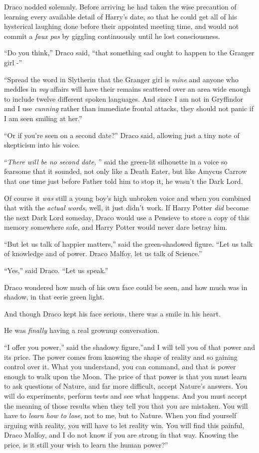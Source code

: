 Draco nodded solemnly. Before arriving he had taken the wise precaution
of learning every available detail of Harry's date, so that he could get
all of his hysterical laughing done before their appointed meeting time,
and would not commit a \emph{faux pas} by giggling continuously until he
lost consciousness.

``Do you think,'' Draco said, ``that something sad ought to happen to
the Granger girl -''

``Spread the word in Slytherin that the Granger girl is \emph{mine} and
anyone who meddles in \emph{my} affairs will have their remains
scattered over an area wide enough to include twelve different spoken
languages. And since I am not in Gryffindor and I use \emph{cunning}
rather than immediate frontal attacks, they should not panic if I am
seen smiling at her.''

``Or if you're seen on a second date?'' Draco said, allowing just a tiny
note of skepticism into his voice.

``\emph{There will be no second date,} '' said the green-lit silhouette in
a voice so fearsome that it sounded, not only like a Death Eater, but
like Amycus Carrow that one time just before Father told him to stop it,
he wasn't the Dark Lord.

Of course it \emph{was} still a young boy's high unbroken voice and when
you combined that with the \emph{actual words}, well, it just didn't
work. If Harry Potter \emph{did} become the next Dark Lord someday,
Draco would use a Pensieve to store a copy of this memory somewhere
safe, and Harry Potter would never dare betray him.

``But let us talk of happier matters,'' said the green-shadowed figure.
``Let us talk of knowledge and of power. Draco Malfoy, let us talk of
Science.''

``Yes,'' said Draco. ``Let us speak.''

Draco wondered how much of his own face could be seen, and how much was
in shadow, in that eerie green light.

And though Draco kept his face serious, there was a smile in his heart.

He was \emph{finally} having a real grownup conversation.

``I offer you power,'' said the shadowy figure,''and I will tell you of
that power and its price. The power comes from knowing the shape of
reality and so gaining control over it. What you understand, you can
command, and that is power enough to walk upon the Moon. The price of
that power is that you must learn to ask questions of Nature, and far
more difficult, accept Nature's answers. You will do experiments,
perform tests and see what happens. And you must accept the meaning of
those results when they tell you that you are mistaken. You will have to
\emph{learn how to lose}, not to me, but to Nature. When you find
yourself arguing with reality, you will have to let reality win. You
will find this painful, Draco Malfoy, and I do not know if you are
strong in that way. Knowing the price, is it still your wish to learn
the human power?''

